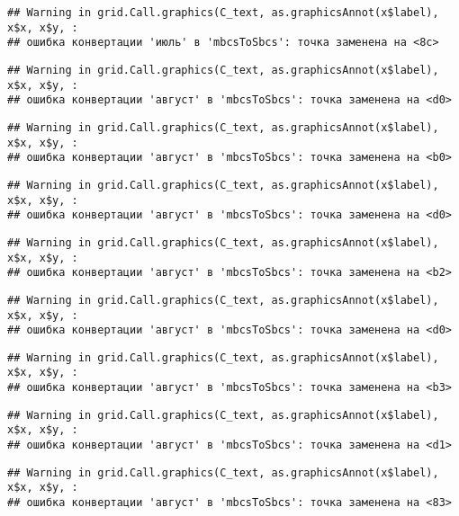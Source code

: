 \documentclass[
]{article}
\begin{document}
\begin{verbatim}
## Warning in grid.Call.graphics(C_text, as.graphicsAnnot(x$label), x$x, x$y, :
## ошибка конвертации 'июль' в 'mbcsToSbcs': точка заменена на <8c>
\end{verbatim}

\begin{verbatim}
## Warning in grid.Call.graphics(C_text, as.graphicsAnnot(x$label), x$x, x$y, :
## ошибка конвертации 'август' в 'mbcsToSbcs': точка заменена на <d0>
\end{verbatim}

\begin{verbatim}
## Warning in grid.Call.graphics(C_text, as.graphicsAnnot(x$label), x$x, x$y, :
## ошибка конвертации 'август' в 'mbcsToSbcs': точка заменена на <b0>
\end{verbatim}

\begin{verbatim}
## Warning in grid.Call.graphics(C_text, as.graphicsAnnot(x$label), x$x, x$y, :
## ошибка конвертации 'август' в 'mbcsToSbcs': точка заменена на <d0>
\end{verbatim}

\begin{verbatim}
## Warning in grid.Call.graphics(C_text, as.graphicsAnnot(x$label), x$x, x$y, :
## ошибка конвертации 'август' в 'mbcsToSbcs': точка заменена на <b2>
\end{verbatim}

\begin{verbatim}
## Warning in grid.Call.graphics(C_text, as.graphicsAnnot(x$label), x$x, x$y, :
## ошибка конвертации 'август' в 'mbcsToSbcs': точка заменена на <d0>
\end{verbatim}

\begin{verbatim}
## Warning in grid.Call.graphics(C_text, as.graphicsAnnot(x$label), x$x, x$y, :
## ошибка конвертации 'август' в 'mbcsToSbcs': точка заменена на <b3>
\end{verbatim}

\begin{verbatim}
## Warning in grid.Call.graphics(C_text, as.graphicsAnnot(x$label), x$x, x$y, :
## ошибка конвертации 'август' в 'mbcsToSbcs': точка заменена на <d1>
\end{verbatim}

\begin{verbatim}
## Warning in grid.Call.graphics(C_text, as.graphicsAnnot(x$label), x$x, x$y, :
## ошибка конвертации 'август' в 'mbcsToSbcs': точка заменена на <83>
\end{verbatim}
\end{document}
